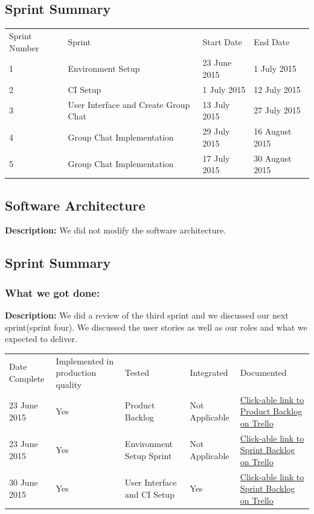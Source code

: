 \documentclass[a4paper]{article}
\begin{document}
\subsection{Sprint Summary}
\setlength{\arrayrulewidth}{0.5mm}
\setlength{\tabcolsep}{12pt}
\renewcommand{\arraystretch}{2} 
\begin{tabular}{ |p{2.5cm}|p{2.5cm}|p{2.5cm} |p{2.5cm}| }
\hline
\rowcolor{lightgray}\multicolumn{4}{|c|}{Sprint Summary} \\
\hline
Sprint Number & Sprint & Start Date & End Date\\
\hline 
1 & Environment Setup & 23 June 2015 & 1 July 2015 \\
\hline
2 & CI Setup & 1 July 2015 & 12 July 2015 \\
\hline
3 & User Interface  and Create Group Chat & 13 July 2015 & 27 July 2015 \\
\hline
4 & Group Chat Implementation & 29 July 2015 & 16 August 2015 \\
\hline
5 & Group Chat Implementation & 17 July 2015 & 30 August 2015 \\
\hline
\end{tabular}

\subsection{Software Architecture}
\textbf{Description: }We did not modify the software architecture. \\

\subsection{Sprint Summary}
\subsubsection{What we got done: }
\textbf{Description: }We did a review of the third sprint and we discussed our next sprint(sprint four). We discussed the user stories as well as our roles and what we expected to deliver. \\

\setlength{\arrayrulewidth}{0.5mm}
\setlength{\tabcolsep}{12pt}
\renewcommand{\arraystretch}{2} 
\begin{tabular}{ |p{2.5cm}|p{2.5cm}|p{2.5cm}|p{2.5cm}| p{2.5cm}| }
\hline
\rowcolor{lightgray} \multicolumn{5}{|c|}{Completed Work} \\
\hline
Date Complete & Implemented in production quality & Tested & Integrated & Documented \\
\hline
23 June 2015 & Yes & Product Backlog & Not Applicable & \href{https://trello.com/b/FtBs3HX1}{Click-able link to Product Backlog on Trello}\\ \hline
23 June 2015 & Yes & Environment Setup Sprint & Not Applicable & \href{https://trello.com/b/hBJF6EUd}{Click-able link to Sprint Backlog on Trello}\\ 
\hline
30 June 2015 & Yes & User Interface and CI Setup & Yes & \href{https://trello.com/b/hBJF6EUd}{Click-able link to Sprint Backlog on Trello}\\ 
\hline

\end{tabular}
\end{document}
